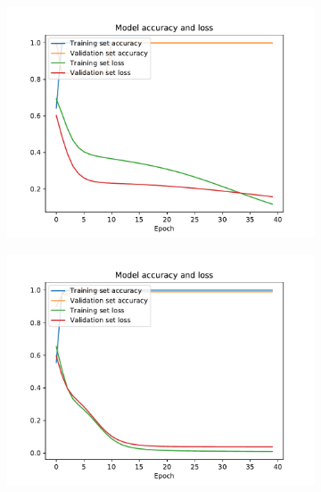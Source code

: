 \documentclass[reprint,amsmath,amssymb,aps,prb]{revtex4-2}
\begin{document}
\newpage
\begin{figure}[H]
	\begin{subfigure}[c]{0.3\textwidth}
		\includegraphics[width=\textwidth]{../results/N10_accuracy_loss_epochs}
		\label{fig:N10_accuracy_loss_epochs}
	\end{subfigure}
	\begin{subfigure}[c]{0.3\textwidth}
		\includegraphics[width=\textwidth]{../results/N11_accuracy_loss_epochs}
		\label{fig:N11_loss_epochs}
	\end{subfigure}
	\begin{subfigure}[c]{0.3\textwidth}

\end{subfigure}
\end{figure}
\end{document}
